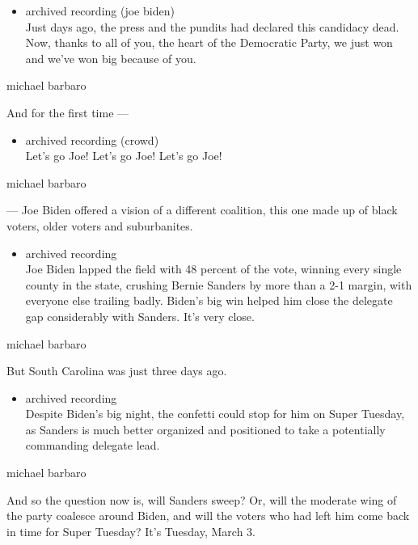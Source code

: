 \begin{itemize}
\tightlist
\item
  archived recording (joe biden)\\
  Just days ago, the press and the pundits had declared this candidacy
  dead. Now, thanks to all of you, the heart of the Democratic Party, we
  just won and we've won big because of you.
\end{itemize}

michael barbaro

And for the first time ---

\begin{itemize}
\tightlist
\item
  archived recording (crowd)\\
  Let's go Joe! Let's go Joe! Let's go Joe!
\end{itemize}

michael barbaro

--- Joe Biden offered a vision of a different coalition, this one made
up of black voters, older voters and suburbanites.

\begin{itemize}
\tightlist
\item
  archived recording\\
  Joe Biden lapped the field with 48 percent of the vote, winning every
  single county in the state, crushing Bernie Sanders by more than a 2-1
  margin, with everyone else trailing badly. Biden's big win helped him
  close the delegate gap considerably with Sanders. It's very close.
\end{itemize}

michael barbaro

But South Carolina was just three days ago.

\begin{itemize}
\tightlist
\item
  archived recording\\
  Despite Biden's big night, the confetti could stop for him on Super
  Tuesday, as Sanders is much better organized and positioned to take a
  potentially commanding delegate lead.
\end{itemize}

michael barbaro

And so the question now is, will Sanders sweep? Or, will the moderate
wing of the party coalesce around Biden, and will the voters who had
left him come back in time for Super Tuesday? It's Tuesday, March 3.

